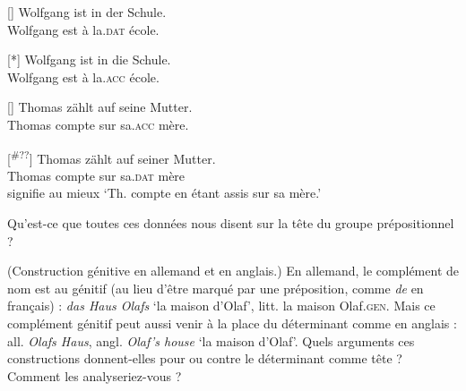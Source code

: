 {    \begin{exe}
    []{
    \gll   Wolfgang ist in der Schule.\\
    Wolfgang est à la.\textsc{dat} école.\\}

    [*]{
    \gll   Wolfgang ist in die Schule. \\
    Wolfgang est à la.\textsc{acc} école.\\}

    []{
    \gll Thomas zählt auf seine Mutter.\\
    Thomas compte sur sa.\textsc{acc} mère.\\}

    [\textsuperscript{\#??}]{
    \gll Thomas zählt auf seiner Mutter.\\
    Thomas compte sur sa.\textsc{dat} mère \\
    \glt    signifie au mieux ‘Th. compte en étant assis sur sa mère.’}
    \end{exe}

    \noindent Qu’est-ce que toutes ces données nous disent sur la tête du groupe prépositionnel ?

     ({Construction génitive en allemand et en anglais.}) En allemand, le complément de nom est au génitif (au lieu d’être marqué par une préposition, comme \textit{de} en français) : \textit{das Haus Olafs} ‘la maison d’Olaf’, litt. la maison Olaf.\textsc{gen}. Mais ce complément génitif peut aussi venir à la place du déterminant comme en anglais : all. \textit{Olafs Haus}, angl. \textit{Olaf’s house} ‘la maison d’Olaf’. Quels arguments ces constructions donnent-elles pour ou contre le déterminant comme tête ? Comment les analyseriez-vous ?
}
